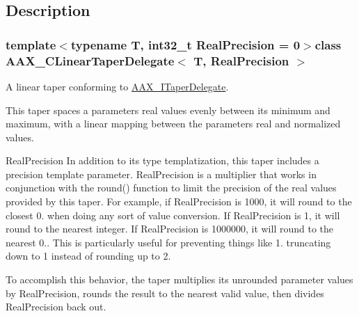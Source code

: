\subsection{Description}
\subsubsection*{template$<$typename T, int32\+\_\+t Real\+Precision = 0$>$class A\+A\+X\+\_\+\+C\+Linear\+Taper\+Delegate$<$ T, Real\+Precision $>$}

A linear taper conforming to \hyperlink{a00114}{A\+A\+X\+\_\+\+I\+Taper\+Delegate}. 

This taper spaces a parameter\textquotesingle{}s real values evenly between its minimum and maximum, with a linear mapping between the parameter\textquotesingle{}s real and normalized values.

\begin{DoxyParagraph}{Real\+Precision}
In addition to its type templatization, this taper includes a precision template parameter. Real\+Precision is a multiplier that works in conjunction with the round() function to limit the precision of the real values provided by this taper. For example, if Real\+Precision is 1000, it will round to the closest 0. when doing any sort of value conversion. If Real\+Precision is 1, it will round to the nearest integer. If Real\+Precision is 1000000, it will round to the nearest 0.. This is particularly useful for preventing things like 1. truncating down to 1 instead of rounding up to 2.
\end{DoxyParagraph}
To accomplish this behavior, the taper multiplies its unrounded parameter values by Real\+Precision, rounds the result to the nearest valid value, then divides Real\+Precision back out.

